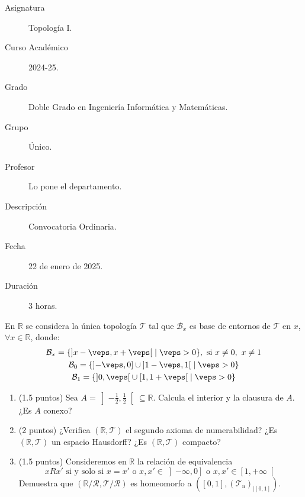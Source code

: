 \documentclass[12pt]{article}
\begin{document}

    
    

    \begin{description}
        \item[Asignatura] Topología I.
        \item[Curso Académico] 2024-25.
        \item[Grado] Doble Grado en Ingeniería Informática y Matemáticas.
        \item[Grupo] Único.
        \item[Profesor] Lo pone el departamento.
        \item[Descripción] Convocatoria Ordinaria.
        \item[Fecha] 22 de enero de 2025.
        \item[Duración] 3 horas.
    
    \end{description}
    \newpage

    \begin{ejercicio}
        En $\mathbb{R}$ se considera la única topología $\mathcal{T}$ tal que $\mathcal{B}_x$ es base de entornos de $\mathcal{T}$ en $x$, $\forall x\in \mathbb{R}$, donde:
        \begin{gather*}
            \mathcal{B}_x = \{\left]x-\veps,x+\veps\right[ \mid \veps > 0\}, \text{\ si\ } x\neq 0,\ x\neq 1 \\
        \mathcal{B}_0 = \{\left]-\veps, 0\right] \cup \left]1-\veps, 1\right[ \mid \veps > 0\} \\
        \mathcal{B}_1 = \{\left]0,\veps\right[\cup \left[1,1+\veps\right[\mid \veps > 0\}
        \end{gather*}
        \begin{enumerate}[label=(\alph*)]
            \item (1.5 puntos) Sea $A = \left]-\frac{1}{2},\frac{1}{2}\right[\subseteq \mathbb{R}$. Calcula el interior y la clausura de $A$. ¿Es $A$ conexo?
            \item (2 puntos) ¿Verifica $(\mathbb{R}, \mathcal{T})$ el segundo axioma de numerabilidad? ¿Es $(\mathbb{R}, \mathcal{T})$ un espacio Hausdorff? ¿Es $(\mathbb{R}, \mathcal{T})$ compacto?
            \item (1.5 puntos) Consideremos en $\mathbb{R}$ la relación de equivalencia
                \begin{equation*}
                xRx' \text{\ si y solo si\ } x=x' \text{\ o\ }x,x'\in \left]-\infty,0\right] \text{\ o\ } x,x' \in \left[1,+\infty\right[
                \end{equation*}
                Demuestra que $(\mathbb{R}/\mathcal{R}, \mathcal{T}/\mathcal{R})$ es homeomorfo a $([0,1], {(\mathcal{T}_u)}_{|[0,1]})$.
        \end{enumerate}
    \end{ejercicio}
\end{document}
